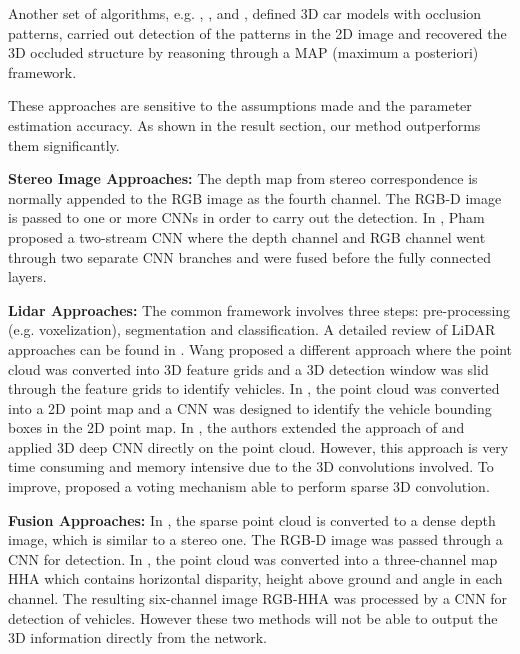 \documentclass[letterpaper, 10 pt, conference]{ieeeconf}  \usepackage[
\begin{document}
Another set of algorithms, e.g. \cite{xiang2015data}, \cite{xiang2017subcategory}, \cite{zeeshan2014cars} and \cite{zeeshan2013explicit}, defined 3D car models with occlusion patterns, carried out detection of the patterns in the 2D image and recovered the 3D occluded structure by reasoning through a MAP (maximum a posteriori) framework.

These approaches are sensitive to the assumptions made and the parameter estimation accuracy. As shown in the result section, our method outperforms them significantly.

\textbf{Stereo Image Approaches:} The depth map from stereo correspondence is normally appended to the RGB image as the fourth channel. The RGB-D image is passed to one or more CNNs in order to carry out the detection. In \cite{Pham2017}, Pham  proposed a two-stream CNN where the depth channel and RGB channel went through two separate CNN branches and were fused before the fully connected layers. 

\textbf{Lidar Approaches:} The common framework involves three steps: pre-processing (e.g. voxelization), segmentation and classification. A detailed review of LiDAR approaches can be found in \cite{pendleton2017perception}. Wang  \cite{wang2015voting} proposed a different approach where the point cloud was converted into 3D feature grids and a 3D detection window was slid through the feature grids to identify vehicles. In \cite{li2016vehicle}, the point cloud was converted into a 2D point map and a CNN was designed to identify the vehicle bounding boxes in the 2D point map. In \cite{li20163d}, the authors extended the approach of \cite{li2016vehicle} and applied 3D deep CNN directly on the point cloud. However, this approach is very time consuming and memory intensive due to the 3D convolutions involved. To improve, \cite{engelcke2017vote3deep} proposed a voting mechanism able to perform sparse 3D convolution.

\textbf{Fusion Approaches:} In \cite{eitel2015multimodal}, the sparse point cloud is converted to a dense depth image, which is similar to a stereo one. The RGB-D image was passed through a CNN for detection. In \cite{schlosser2016fusing}, the point cloud was converted into a three-channel map HHA which contains horizontal disparity, height above ground and angle in each channel. The resulting six-channel image RGB-HHA was processed by a CNN for detection of vehicles. However these two methods will not be able to output the 3D information directly from the network.
\end{document}
